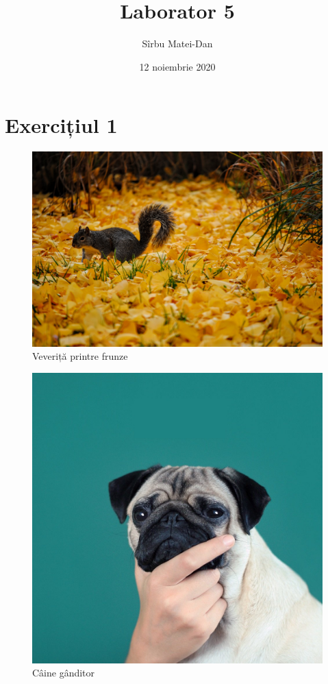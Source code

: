 \documentclass[9pt,a4paper]{article}
\title{\bf Laborator 5}
\author{Sîrbu Matei-Dan}
\date{12 noiembrie 2020}
\begin{document}
\maketitle

\section*{Exercițiul 1}

\begin{figure}[htbp]
    \centering
    \includegraphics[trim= 10cm 20cm 50cm 15cm, clip, width=1\textwidth]{images/squirrel.jpg}
    \caption{Veveriță printre frunze}
\end{figure}

\begin{figure}[htbp]
    \centering
    \includegraphics[trim= 10cm 10cm 0 12cm, clip, width=1\textwidth]{images/pug.jpg}
    \caption{Câine gânditor}
\end{figure}
\end{document}
